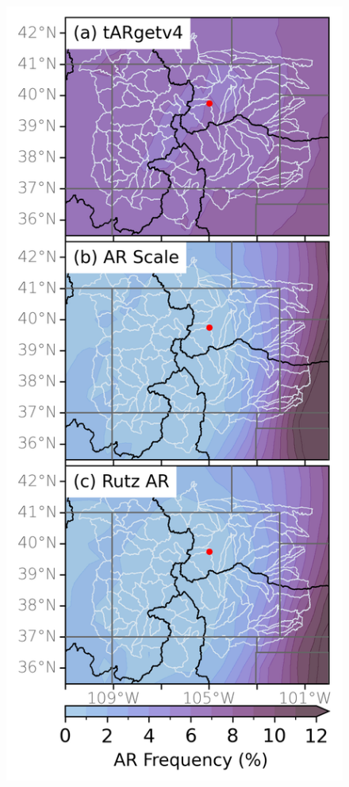 \documentclass[draft]{agujournal2019}
\begin{document}
\begin{figure}
\noindent\includegraphics[width=\textwidth, height=\textheight, keepaspectratio]{fig2.png}

\end{figure}
\end{document}
